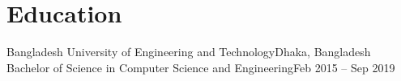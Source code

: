 \section{Education}
\resumeSubheading
  {Bangladesh University of Engineering and Technology}{Dhaka, Bangladesh}
  {Bachelor of Science in Computer Science and Engineering}{Feb 2015 -- Sep 2019}